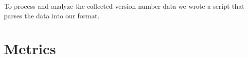 \documentclass[conference]{IEEEtran}
\begin{document}
 
 
 To process and analyze the collected version number data we wrote a script that parses the data into our format. 












\section{Metrics}
\end{document}
